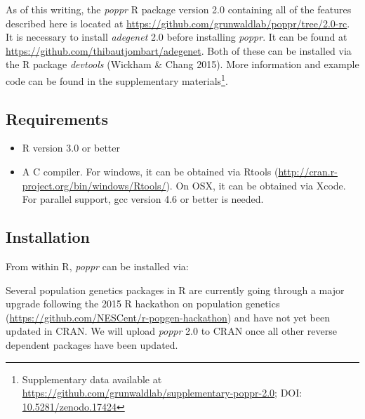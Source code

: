 \documentclass[double,12pt]{beavtex}
\providecommand{\tightlist}{%
  \setlength{\itemsep}{0pt}\setlength{\parskip}{0pt}}
\begin{document}
  As of this writing, the \emph{poppr} R package version 2.0 containing
  all of the features described here is located at
  \url{https://github.com/grunwaldlab/poppr/tree/2.0-rc}. It is necessary
  to install \emph{adegenet} 2.0 before installing \emph{poppr}. It can be
  found at \url{https://github.com/thibautjombart/adegenet}. Both of these
  can be installed via the R package \emph{devtools} (Wickham \& Chang
  2015). More information and example code can be found in the
  supplementary materials\footnote{Supplementary data available at
    \url{https://github.com/grunwaldlab/supplementary-poppr-2.0}; DOI:
    \href{http://dx.doi.org/10.5281/zenodo.17424}{10.5281/zenodo.17424}}.
  
  \subsection{Requirements}\label{requirements}
  
  \begin{itemize}
  \tightlist
  \item
    R version 3.0 or better
  \item
    A C compiler. For windows, it can be obtained via Rtools
    (\url{http://cran.r-project.org/bin/windows/Rtools/}). On OSX, it can
    be obtained via Xcode. For parallel support, gcc version 4.6 or better
    is needed.
  \end{itemize}
  
  \newpage
  
  \subsection{Installation}\label{installation}
  
  From within R, \emph{poppr} can be installed via:
  
  \begin{Shaded}
  \begin{Highlighting}[]
  \NormalTok{(}\NormalTok{)}
  \NormalTok{(}\NormalTok{)}
  \NormalTok{(}\NormalTok{)}
  \NormalTok{(}\NormalTok{)}
  \end{Highlighting}
  \end{Shaded}
  
  Several population genetics packages in R are currently going through a
  major upgrade following the 2015 R hackathon on population genetics
  (\url{https://github.com/NESCent/r-popgen-hackathon}) and have not yet
  been updated in CRAN. We will upload \emph{poppr} 2.0 to CRAN once all
  other reverse dependent packages have been updated.
  
\end{document}
